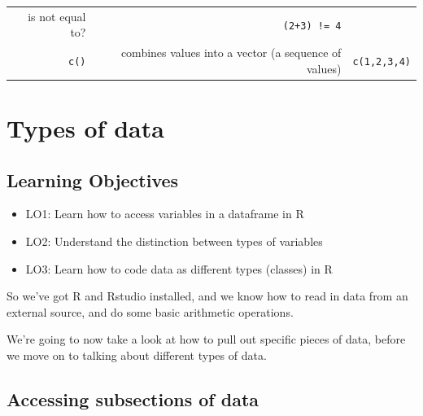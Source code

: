 \documentclass[]{book}
\providecommand{\tightlist}{%
  \setlength{\itemsep}{0pt}\setlength{\parskip}{0pt}}
\begin{document}
\begin{longtable}[]{@{}rrr@{}}
\begin{minipage}[t]{0.30\columnwidth}
is not equal to?\strut
\end{minipage} & \begin{minipage}[t]{0.30\columnwidth}\raggedleft
\texttt{(2+3)\ !=\ 4}\strut
\end{minipage}\tabularnewline
\begin{minipage}[t]{0.30\columnwidth}\raggedleft
\texttt{c()}\strut
\end{minipage} & \begin{minipage}[t]{0.30\columnwidth}\raggedleft
combines values into a vector (a sequence of values)\strut
\end{minipage} & \begin{minipage}[t]{0.30\columnwidth}\raggedleft
\texttt{c(1,2,3,4)}\strut
\end{minipage}\tabularnewline
\bottomrule
\end{longtable}

\hypertarget{chap-data-types}{%
\chapter{Types of data}\label{chap-data-types}}

\hypertarget{learning-objectives-1}{%
\section*{Learning Objectives}\label{learning-objectives-1}}

\begin{itemize}
\tightlist
\item
  LO1: Learn how to access variables in a dataframe in R\\
\item
  LO2: Understand the distinction between types of variables\\
\item
  LO3: Learn how to code data as different types (classes) in R
\end{itemize}

So we've got R and Rstudio installed, and we know how to read in data from an external source, and do some basic arithmetic operations.

We're going to now take a look at how to pull out specific pieces of data, before we move on to talking about different types of data.

\hypertarget{accessing-subsections-of-data}{%
\section{Accessing subsections of data}\label{accessing-subsections-of-data}}
\end{document}
